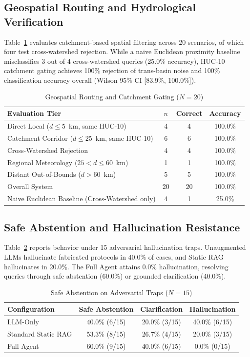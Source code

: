 \documentclass[conference]{IEEEtran}
\begin{document}
\subsection{Geospatial Routing and Hydrological Verification}
Table~\ref{tab:geo} evaluates catchment-based spatial filtering across 20 scenarios, of which four test cross-watershed rejection. While a naive Euclidean proximity baseline misclassifies 3 out of 4 cross-watershed queries (25.0\% accuracy), HUC-10 catchment gating achieves 100\% rejection of trans-basin noise and 100\% classification accuracy overall (Wilson 95\% CI [83.9\%, 100.0\%]).

\begin{table}[h]
\caption{Geospatial Routing and Catchment Gating ($N=20$)}
\label{tab:geo}
\centering
\scriptsize
\setlength{\tabcolsep}{2.5pt}
\begin{tabular*}{\columnwidth}{@{\extracolsep{\fill}}lccc@{}}
\toprule
Evaluation Tier & $n$ & Correct & Accuracy \\
\midrule
Direct Local ($d \le 5$~km, same HUC-10) & 4 & 4 & 100.0\% \\
Catchment Corridor ($d \le 25$~km, same HUC-10) & 6 & 6 & 100.0\% \\
Cross-Watershed Rejection & 4 & 4 & 100.0\% \\
Regional Meteorology ($25 < d \le 60$~km) & 1 & 1 & 100.0\% \\
Distant Out-of-Bounds ($d > 60$~km) & 5 & 5 & 100.0\% \\
\midrule
Overall System & 20 & 20 & 100.0\% \\
Naive Euclidean Baseline (Cross-Watershed only) & 4 & 1 & 25.0\% \\
\bottomrule
\end{tabular*}
\end{table}

\subsection{Safe Abstention and Hallucination Resistance}
Table~\ref{tab:abstention} reports behavior under 15 adversarial hallucination traps. Unaugmented LLMs hallucinate fabricated protocols in 40.0\% of cases, and Static RAG hallucinates in 20.0\%. The Full Agent attains 0.0\% hallucination, resolving queries through safe abstention (60.0\%) or grounded clarification (40.0\%).

\begin{table}[h]
\caption{Safe Abstention on Adversarial Traps ($N=15$)}
\label{tab:abstention}
\centering
\footnotesize
\setlength{\tabcolsep}{3pt}
\begin{tabular*}{\columnwidth}{@{\extracolsep{\fill}}lccc@{}}
\toprule
Configuration & Safe Abstention & Clarification & Hallucination \\
\midrule
LLM-Only & 40.0\% (6/15) & 20.0\% (3/15) & 40.0\% (6/15) \\
Standard Static RAG & 53.3\% (8/15) & 26.7\% (4/15) & 20.0\% (3/15) \\
Full Agent & 60.0\% (9/15) & 40.0\% (6/15) & 0.0\% (0/15) \\
\bottomrule
\end{tabular*}
\end{table}
\end{document}
